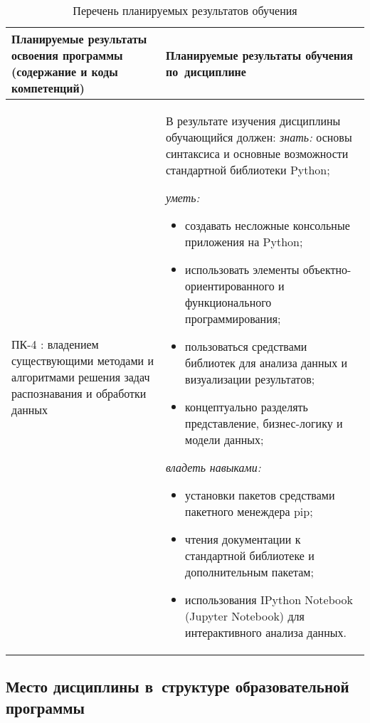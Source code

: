 \documentclass[a4paper,12pt]{article}
\begin{document}
\begin{longtable}{|p{54mm}|p{100mm}|}
  \caption{Перечень планируемых результатов обучения}\\
  \hline
  \centering
  Планируемые результаты освоения программы (содержание и коды компетенций) & 
  \centering\arraybackslash
  Планируемые результаты обучения по~дисциплине
  \\
  \hline
  
  ПК-4 : владением существующими методами и алгоритмами решения задач распознавания и обработки данных
  & 
  В результате изучения дисциплины обучающийся должен:\newline
  \emph{знать:}
  основы синтаксиса и основные возможности стандартной библиотеки Python;
  

  \emph{уметь:}
  \begin{itemize}[leftmargin=12pt]
    \item создавать несложные консольные приложения на Python; 
    \item использовать элементы объект\-но-ориен\-ти\-ро\-ван\-но\-го и функционального программирования; 
    \item пользоваться средствами библиотек для анализа данных и визуализации результатов; 
    \item концептуально разделять представление, бизнес-логику и модели данных; 
  \end{itemize}
  

  \emph{владеть навыками:}
  \begin{itemize}[leftmargin=12pt]
    \item установки пакетов средствами пакетного менеждера pip; 
    \item чтения документации к стандартной библиотеке и дополнительным пакетам; 
    \item использования IPython Notebook (Jupyter Notebook) для интерактивного анализа данных. 
  \end{itemize}
  
  \\
  \hline
  \end{longtable}


\subsection{Место дисциплины в~структуре образовательной программы}
\end{document}
